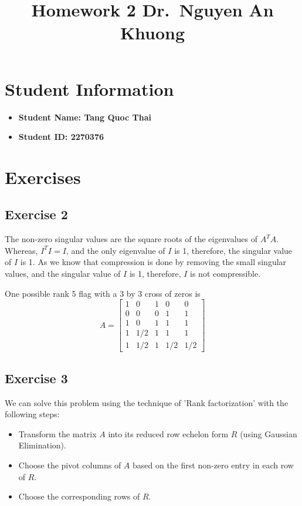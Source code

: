 \documentclass{article}
\author{}
\begin{document}
\title{Homework 2 \- Dr.\ Nguyen An Khuong}
\maketitle
\section{Student Information}
\begin{itemize}
    \item \bf{Student Name:} Tang Quoc Thai
    \item \bf{Student ID:} 2270376
\end{itemize}

\section{Exercises}
\subsection{Exercise 2}
The non-zero singular values are the square roots of the eigenvalues of $A^{T}A$. Whereas, $I^{T}I = I$, and the only eigenvalue of $I$ is 1, therefore, the singular value of $I$ is 1. As we know that compression is done by removing the small singular values, and the singular value of $I$ is 1, therefore, $I$ is not compressible.

One possible rank 5 flag with a 3 by 3 cross of zeros is
\[
    A =
    \begin{bmatrix}
        1 & 0   & 1 & 0   & 0   \\
        0 & 0   & 0 & 1   & 1   \\
        1 & 0   & 1 & 1   & 1   \\
        1 & 1/2 & 1 & 1   & 1   \\
        1 & 1/2 & 1 & 1/2 & 1/2
    \end{bmatrix}
\]


\subsection{Exercise 3}
We can solve this problem using the technique of 'Rank factorization' with the following steps:

\begin{itemize}
    \item Transform the matrix $A$ into its reduced row echelon form $R$ (using Gaussian Elimination).
    \item Choose the pivot columns of $A$ based on the first non-zero entry in each row of $R$.
    \item Choose the corresponding rows of $R$.
\end{itemize}
\end{document}
